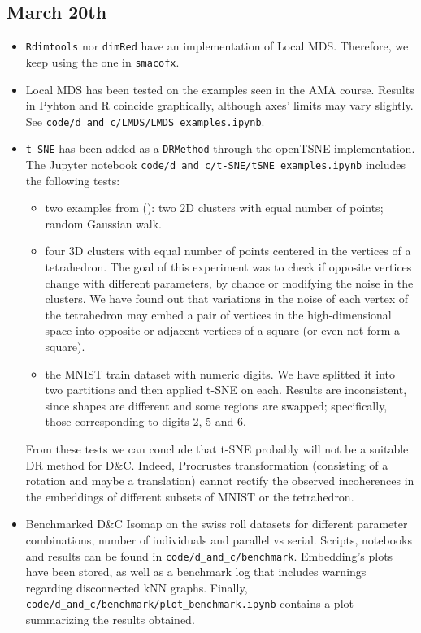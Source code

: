\documentclass[a4paper,12pt]{article}
\begin{document}
\subsection{March 20th}
\begin{itemize}
    \item \texttt{Rdimtools} nor \texttt{dimRed} have an implementation of Local MDS. Therefore, we keep using the one in \texttt{smacofx}.
    \item Local MDS has been tested on the examples seen in the AMA course. Results in Pyhton and R coincide graphically, although axes' limits may vary slightly. See \verb|code/d_and_c/LMDS/LMDS_examples.ipynb|.
    \item \texttt{t-SNE} has been added as a \texttt{DRMethod} through the openTSNE implementation. The Jupyter notebook \verb|code/d_and_c/t-SNE/tSNE_examples.ipynb| includes the following tests:
    \begin{itemize}
        \item two examples from (\cite{Wattenberg2016}): two 2D clusters with equal number of points; random Gaussian walk.
        \item four 3D clusters with equal number of points centered in the vertices of a tetrahedron. The goal of this experiment was to check if opposite vertices change with different parameters, by chance or modifying the noise in the clusters. We have found out that variations in the noise of each vertex of the tetrahedron may embed a pair of vertices in the high-dimensional space into opposite or adjacent vertices of a square (or even not form a square).
        \item the MNIST train dataset with numeric digits. We have splitted it into two partitions and then applied t-SNE on each. Results are inconsistent, since shapes are different and some regions are swapped; specifically, those corresponding to digits 2, 5 and 6.
    \end{itemize}
    From these tests we can conclude that t-SNE probably will not be a suitable DR method for D\&C. Indeed, Procrustes transformation (consisting of a rotation and maybe a translation) cannot rectify the observed incoherences in the embeddings of different subsets of MNIST or the tetrahedron.
    \item Benchmarked D\&C Isomap on the swiss roll datasets for different parameter combinations, number of individuals and parallel vs serial. Scripts, notebooks and results can be found in \verb|code/d_and_c/benchmark|. Embedding's plots have been stored, as well as a benchmark log that includes warnings regarding disconnected kNN graphs. Finally, \verb|code/d_and_c/benchmark/plot_benchmark.ipynb| contains a plot summarizing the results obtained.
\end{itemize}
\end{document}
